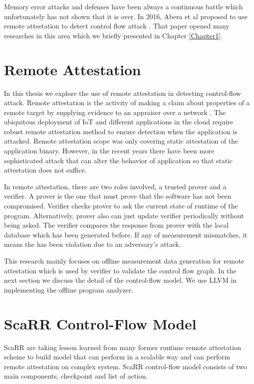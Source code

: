 Memory error attacks and defenses have been always a continuous battle which
unfortunately has not shown that it is over. In 2016, Abera et al proposed to
use remote attestation to detect control flow attack
\cite{aberaCFLATControlFlowAttestation2016}. That paper opened many researches
in this area which we briefly presented in Chapter \ref{Chapter1}.
 
\section{Remote Attestation}
\label{sec:remote-attestation}

In this thesis we explore the use of remote attestation in detecting
control-flow attack. Remote attestation is the activity of making a claim about
properties of a remote target by supplying evidence to an appraiser over a
network \cite{cokerPrinciplesRemoteAttestation2011a}. The ubiquitous deployment
of IoT and different applications in the cloud require robust remote attestation
method to ensure detection when the application is attacked.  Remote attestation
scope was only covering static attestation of the application binary. However,
in the recent years there have been more sophisticated attack that can alter the
behavior of application so that static attestation does not suffice. 

In remote attestation, there are two roles involved, a trusted prover and a
verifier. A prover is the one that must prove that the software has not been
compromised. Verifier checks prover to ask the current state of runtime of the
program. Alternatively, prover also can just update verifier periodically
without being asked. The verifier compares the response from prover with the
local database which has been generated before. If any of measurement
mismatches, it means the has been violation due to an adversary's attack.

This research mainly focuses on offline measurement data generation for remote
attestation which is used by verifier to validate the control flow graph. In the
next section we discuss the detail of the control-flow model. We use LLVM in
implementing the offline program analyzer.

\section{ScaRR Control-Flow Model} 
\label{sec:scarr-model}

ScaRR \cite{toffaliniScaRRScalableRuntime2019} are taking lesson learned from
many former runtime remote attestation scheme to build model that can perform in
a scalable way and can perform remote attestation on complex system. ScaRR
control-flow model consists of two main components, checkpoint and list of
action. 

